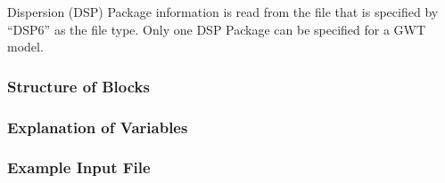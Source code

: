Dispersion (DSP) Package information is read from the file that is specified by ``DSP6'' as the file type.  Only one DSP Package can be specified for a GWT model. 

\vspace{5mm}
\subsubsection{Structure of Blocks}



\vspace{5mm}
\subsubsection{Explanation of Variables}
\begin{description}

\end{description}

\vspace{5mm}
\subsubsection{Example Input File}



